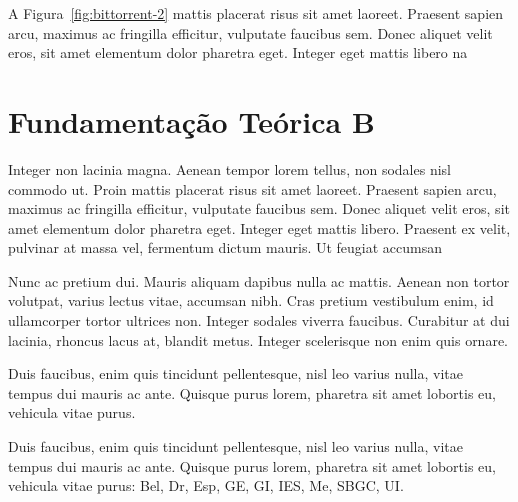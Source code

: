 A Figura~\ref{fig:bittorrent-2}  mattis placerat risus sit amet laoreet. Praesent sapien arcu, maximus ac fringilla efficitur, vulputate faucibus sem. Donec aliquet velit eros, sit amet elementum dolor pharetra eget. Integer eget mattis libero na

\section{Fundamentação Teórica B}
\label{sec:fundamentacao-teorica-b}

Integer non lacinia magna. Aenean tempor lorem tellus, non sodales nisl commodo ut. Proin mattis placerat risus sit amet laoreet. Praesent sapien arcu, maximus ac fringilla efficitur, vulputate faucibus sem. Donec aliquet velit eros, sit amet elementum dolor pharetra eget. Integer eget mattis libero. Praesent ex velit, pulvinar at massa vel, fermentum dictum mauris. Ut feugiat accumsan

Nunc ac pretium dui. Mauris aliquam dapibus nulla ac mattis. Aenean non tortor volutpat, varius lectus vitae, accumsan nibh. Cras pretium vestibulum enim, id ullamcorper tortor ultrices non. Integer sodales viverra faucibus. Curabitur at dui lacinia, rhoncus lacus at, blandit metus. Integer scelerisque non enim quis ornare.

	\begin{table}[h!]
		\centering
	\end{table}

Duis faucibus, enim quis tincidunt pellentesque, nisl leo varius nulla, vitae tempus dui mauris ac ante. Quisque purus lorem, pharetra sit amet lobortis eu, vehicula vitae purus.

Duis faucibus, enim quis tincidunt pellentesque, nisl leo varius nulla, vitae tempus dui mauris ac ante. Quisque purus lorem, pharetra sit amet lobortis eu, vehicula vitae purus: \acrlong{Bel}, \acrlong{Dr}, \acrlong{Esp}, \acrlong{GE}, \acrlong{GI}, \acrlong{IES}, \acrlong{Me}, \acrlong{SBGC}, \acrlong{UI}.

